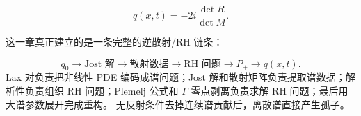 \documentclass[
    lang=cn,
    scheme=chinese,
    mode=simple,
    device=normal,
    color=blue,
    math=cm,
    thmcnt=section,
    12pt,
    nowatermark
]{elegantbook}
\begin{document}
\[
    q(x,t)
    =
    -2i\dfrac{\det R}{\det M}.
\]

\begin{callout}[组会最后一句]
    这一章真正建立的是一条完整的逆散射/RH 链条：

    \[
        \boxed{
            q_0
            \longrightarrow
            \text{Jost 解}
            \longrightarrow
            \text{散射数据}
            \longrightarrow
            \text{RH 问题}
            \longrightarrow
            P_+
            \longrightarrow
            q(x,t).
        }
    \]
    Lax 对负责把非线性 PDE 编码成谱问题；Jost 解和散射矩阵负责提取谱数据；解析性负责组织 RH 问题；Plemelj 公式和 $\Gamma$ 零点剥离负责求解 RH 问题；最后用大谱参数展开完成重构。
    无反射条件去掉连续谱贡献后，离散谱直接产生孤子。
\end{callout}
\end{document}
